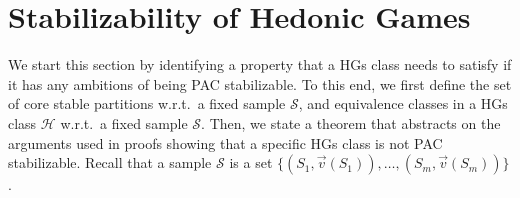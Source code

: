 \documentclass[letterpaper]{article} %
\newtheorem{definition}[theorem]{Definition}
\newcommand{\set}[1]{\{#1\}}
\newcommand{\hclass}{\ensuremath{\mathcal{H}}}
\newcommand{\sample}{\ensuremath{\mathcal{S}}}
\newcommand{\GV}[1]{\textcolor{violet}{{\footnotesize #1}}\marginpar{\raggedright\tiny \textcolor{violet}{Giovanna}}}
\begin{document}
\section{Stabilizability of Hedonic Games}\label{sec:stabilizability}
We start this section by identifying a property that a HGs class needs to satisfy if it has any ambitions of being PAC stabilizable. To this end, we first define the set of core stable partitions w.r.t.\ a fixed sample $\sample$, and equivalence classes in a HGs class $\hclass$ w.r.t.\ a fixed sample $\sample$. Then, we state a theorem that abstracts on the arguments used in proofs showing that a specific HGs class is not PAC stabilizable. Recall that a sample $\sample$ is a set $\{( S_1, \vec{v}({S_1})), \ldots, ( S_m, \vec{v}({S_m}))\}$.

\end{document}
